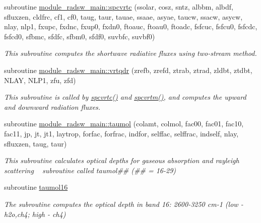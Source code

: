 \textbf{ }\par
\begin{DoxyCompactItemize}
\item 
subroutine \hyperlink{group__module__radsw__main_gaeb992f35bdf7dbf9ea8709d7d91dedfd}{module\+\_\+radsw\+\_\+main\+::spcvrtc} (ssolar, cosz, sntz, albbm, albdf, sfluxzen, cldfrc, cf1, cf0, taug, taur, tauae, ssaae, asyae, taucw, ssacw, asycw, nlay, nlp1, fxupc, fxdnc, fxup0, fxdn0, ftoauc, ftoau0, ftoadc, fsfcuc, fsfcu0, fsfcdc, fsfcd0, sfbmc, sfdfc, sfbm0, sfdf0, suvbfc, suvbf0)
\begin{DoxyCompactList}\small\item\em This subroutine computes the shortwave radiative fluxes using two-\/stream method. \end{DoxyCompactList}\end{DoxyCompactItemize}

\textbf{ }\par
\begin{DoxyCompactItemize}
\item 
subroutine \hyperlink{group__module__radsw__main_gad227ccde86a01f47c1ab3b4bed5ba1be}{module\+\_\+radsw\+\_\+main\+::vrtqdr} (zrefb, zrefd, ztrab, ztrad, zldbt, ztdbt, N\+L\+AY, N\+L\+P1, zfu, zfd)
\begin{DoxyCompactList}\small\item\em This subroutine is called by \hyperlink{group__module__radsw__main_gaeb992f35bdf7dbf9ea8709d7d91dedfd}{spcvrtc()} and \hyperlink{group__module__radsw__main_ga859cc14063a58e9d0a252e4366b9fff3}{spcvrtm()}, and computes the upward and downward radiation fluxes. \end{DoxyCompactList}\end{DoxyCompactItemize}

\textbf{ }\par
\begin{DoxyCompactItemize}
\item 
subroutine \hyperlink{group__module__radsw__main_gaa82121d21c1e8f2ca938378249fea135}{module\+\_\+radsw\+\_\+main\+::taumol} (colamt, colmol, fac00, fac01, fac10, fac11, jp, jt, jt1, laytrop, forfac, forfrac, indfor, selffac, selffrac, indself, nlay, sfluxzen, taug, taur)
\begin{DoxyCompactList}\small\item\em This subroutine calculates optical depths for gaseous absorption and rayleigh scattering ~\newline
 subroutine called taumol\#\# (\#\# = 16-\/29) \end{DoxyCompactList}\item 
subroutine \hyperlink{group__module__radsw__main_ga8702f5f6285ff1a5cbfad740545fffb6}{taumol16}
\begin{DoxyCompactList}\small\item\em The subroutine computes the optical depth in band 16\+: 2600-\/3250 cm-\/1 (low -\/ h2o,ch4; high -\/ ch4) \end{DoxyCompactList}\end{DoxyCompactItemize}

